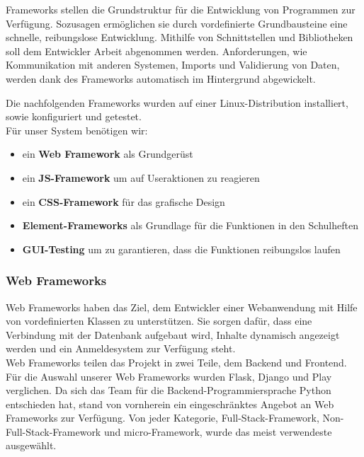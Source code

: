 
Frameworks stellen die Grundstruktur für die Entwicklung von Programmen zur Verfügung. Sozusagen ermöglichen sie durch vordefinierte Grundbausteine eine schnelle, reibungslose Entwicklung. Mithilfe von Schnittstellen und Bibliotheken soll dem Entwickler Arbeit abgenommen werden. Anforderungen, wie Kommunikation mit anderen Systemen, Imports und Validierung von Daten, werden dank des Frameworks automatisch im Hintergrund abgewickelt.

Die nachfolgenden Frameworks wurden auf einer Linux-Distribution installiert, sowie konfiguriert und getestet.\\
Für unser System benötigen wir:
\begin{itemize}
\item ein \textbf{Web Framework} als Grundgerüst
\item ein \textbf{JS-Framework} um auf Useraktionen zu reagieren
\item ein \textbf{\gls{CSS}-Framework} für das grafische Design
\item \textbf{Element-Frameworks} als Grundlage für die Funktionen in den Schulheften
\item \textbf{GUI-Testing} um zu garantieren, dass die Funktionen reibungslos laufen
\end{itemize}

\newpage

\subsubsection{Web Frameworks}
Web Frameworks haben das Ziel, dem Entwickler einer Webanwendung mit Hilfe von vordefinierten Klassen zu unterstützen. Sie sorgen dafür, dass eine Verbindung mit der Datenbank aufgebaut wird, Inhalte dynamisch angezeigt werden und ein Anmeldesystem zur Verfügung steht.\\
Web Frameworks teilen das Projekt in zwei Teile, dem Backend und Frontend.\\
Für die Auswahl unserer Web Frameworks wurden Flask, Django und Play verglichen. Da sich das Team für die Backend-Programmiersprache Python entschieden hat, stand von vornherein ein eingeschränktes Angebot an Web Frameworks zur Verfügung. Von jeder Kategorie, Full-Stack-Framework, Non-Full-Stack-Framework und micro-Framework, wurde das meist verwendeste ausgewählt. 

